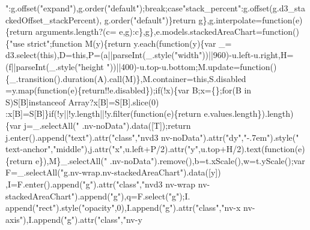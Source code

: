 \begin{DoxyCode}
{      "}:g.offset(\textcolor{stringliteral}{"expand"}),g.order(\textcolor{stringliteral}{"default"});\textcolor{keywordflow}{break};\textcolor{keywordflow}{case}\textcolor{stringliteral}{"stack\_percent"}:g.offset(g.d3\_stackedOffset\_stackPercent),
      g.order(\textcolor{stringliteral}{"default"})\}\textcolor{keywordflow}{return} g\},g.interpolate=\textcolor{keyword}{function}(e)\{\textcolor{keywordflow}{return} arguments.length?(c=
      e,g):c\},g\},e.models.stackedAreaChart=\textcolor{keyword}{function}()\{\textcolor{stringliteral}{"use strict"};\textcolor{keyword}{function} M(y)\{\textcolor{keywordflow}{return} y.each(\textcolor{keyword}{function}(y)\{var \_=
      d3.select(\textcolor{keyword}{this}),D=\textcolor{keyword}{this},P=(a||parseInt(\_.style(\textcolor{stringliteral}{"width"}))||960)-u.left-u.right,H=(f||parseInt(\_.style(\textcolor{stringliteral}{"height
      "}))||400)-u.top-u.bottom;M.update=\textcolor{keyword}{function}()\{\_.transition().duration(A).call(M)\},M.container=\textcolor{keyword}{this},S.disabled
      =y.map(\textcolor{keyword}{function}(e)\{\textcolor{keywordflow}{return}!!e.disabled\});\textcolor{keywordflow}{if}(!x)\{var B;x=\{\};\textcolor{keywordflow}{for}(B in S)S[B]instanceof Array?x[B]=S[B].slice(0)
      :x[B]=S[B]\}\textcolor{keywordflow}{if}(!y||!y.length||!y.filter(\textcolor{keyword}{function}(e)\{return e.values.length\}).length)\{var j=\_.selectAll(\textcolor{stringliteral}{"
      .nv-noData"}).data([T]);\textcolor{keywordflow}{return} j.enter().append(\textcolor{stringliteral}{"text"}).attr(\textcolor{stringliteral}{"class"},\textcolor{stringliteral}{"nvd3 nv-noData"}).attr(\textcolor{stringliteral}{"dy"},\textcolor{stringliteral}{"-.7em"}).style(\textcolor{stringliteral}{"
      text-anchor"},\textcolor{stringliteral}{"middle"}),j.attr(\textcolor{stringliteral}{"x"},u.left+P/2).attr(\textcolor{stringliteral}{"y"},u.top+H/2).text(\textcolor{keyword}{function}(e)\{\textcolor{keywordflow}{return} e\}),M\}\_.selectAll(\textcolor{stringliteral}{"
      .nv-noData"}).remove(),b=t.xScale(),w=t.yScale();var F=\_.selectAll(\textcolor{stringliteral}{"g.nv-wrap.nv-stackedAreaChart"}).data([y])
      ,I=F.enter().append(\textcolor{stringliteral}{"g"}).attr(\textcolor{stringliteral}{"class"},\textcolor{stringliteral}{"nvd3 nv-wrap nv-stackedAreaChart"}).append(\textcolor{stringliteral}{"g"}),q=F.select(\textcolor{stringliteral}{"g"});I.
      append(\textcolor{stringliteral}{"rect"}).style(\textcolor{stringliteral}{"opacity"},0),I.append(\textcolor{stringliteral}{"g"}).attr(\textcolor{stringliteral}{"class"},\textcolor{stringliteral}{"nv-x nv-axis"}),I.append(\textcolor{stringliteral}{"g"}).attr(\textcolor{stringliteral}{"class"},\textcolor{stringliteral}{"nv-y
}
\end{DoxyCode}
